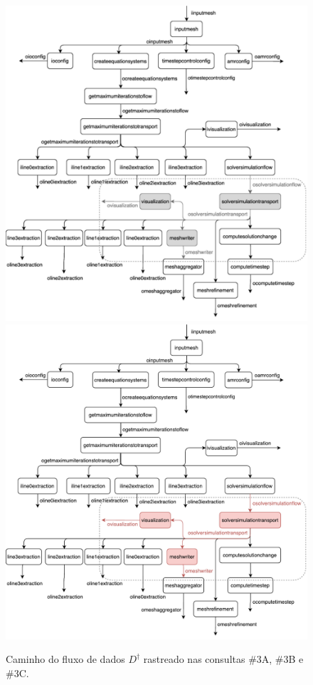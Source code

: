 \begin{figure}[htb]
    \centering
    \ifprint
    \includegraphics[width=\textwidth]{img/experiments-dataflow-3_bw}
    \else
    \includegraphics[width=\textwidth]{img/experiments-dataflow-3}
    \fi
    \caption[Caminho do fluxo de dados \(D^{\dagger}\) rastreado nas consultas \#3A, \#3B e \#3C]{Caminho do fluxo de dados \(D^{\dagger}\) rastreado nas consultas \#3A, \#3B e \#3C.}%
    \label{fig:experiments-dataflow-3}
\end{figure}

